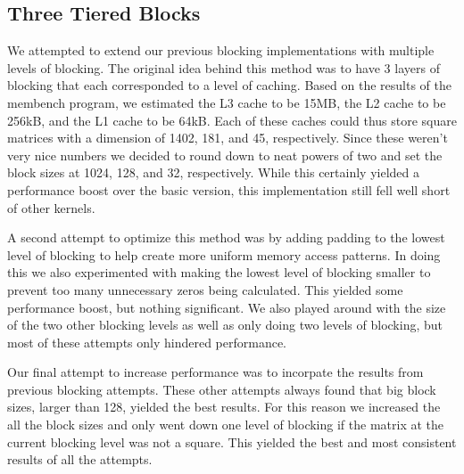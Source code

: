 \subsection{Three Tiered Blocks}
We attempted to extend our previous blocking implementations with multiple
levels of blocking. The original idea behind this method was to have 3 layers 
of blocking that each corresponded to a level of caching. Based on the results 
of the membench program, we estimated the L3 cache to be 15MB, the L2 cache to 
be 256kB, and the L1 cache to be 64kB. Each of these caches could thus store 
square matrices with a dimension of 1402, 181, and 45, respectively. Since 
these weren't very nice numbers we decided to round down to neat powers of two 
and set the block sizes at 1024, 128, and 32, respectively. While this 
certainly yielded a performance boost over the basic version, this 
implementation still fell well short of other kernels.

A second attempt to optimize this method was by adding padding to the lowest 
level of blocking to help create more uniform memory access patterns. In doing 
this we also experimented with making the lowest level of blocking smaller to 
prevent too many unnecessary zeros being calculated. This yielded some 
performance boost, but nothing significant. We also played around with the 
size of the two other blocking levels as well as only doing two levels of 
blocking, but most of these attempts only hindered performance.

Our final attempt to increase performance was to incorpate the results from 
previous blocking attempts. These other attempts always found that big block 
sizes, larger than 128, yielded the best results. For this reason we increased 
the all the block sizes and only went down one level of blocking if the matrix 
at the current blocking level was not a square. This yielded the best and most 
consistent results of all the attempts.